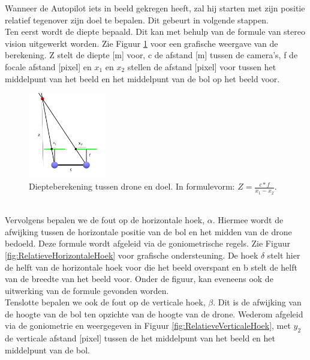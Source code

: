 \noindent
Wanneer de Autopilot iets in beeld gekregen heeft, zal hij starten met zijn positie relatief tegenover zijn doel te bepalen. Dit gebeurt in volgende stappen.
\\
Ten eerst wordt de diepte bepaald. Dit kan met behulp van de formule van stereo vision \cite{website:techbriefs} uitgewerkt worden.
Zie Figuur \ref{fig:DiepteberekeningDroneEnDoel} voor een grafische weergave van de berekening. Z stelt de diepte [m] voor, c de afstand [m] tussen de camera's, f de focale afstand [pixel] en $x_1$ en $x_2$ stellen de afstand [pixel] voor tussen het middelpunt van het beeld en het middelpunt van de bol op het beeld voor.
\begin{figure}[h]
	\centering
	\includegraphics[width=0.3\textwidth]{DiepteberekeningDroneEnDoel.png}
	\caption{Diepteberekening tussen drone en doel. In formulevorm: \(Z = \frac{c * f}{x_1 - x_2}\).}
	\label{fig:DiepteberekeningDroneEnDoel}
\end{figure}
\\
Vervolgens bepalen we de fout op de horizontale hoek, $\alpha$. Hiermee wordt de afwijking tussen de horizontale positie van de bol en het midden van de drone bedoeld. Deze formule wordt afgeleid via de goniometrische regels. Zie Figuur \ref{fig:RelatieveHorizontaleHoek} voor grafische ondersteuning. De hoek $\delta$ stelt hier de helft van de horizontale hoek voor die het beeld overspant en b stelt de helft van de breedte van het beeld voor. Onder de figuur, kan eveneens ook de uitwerking van de formule gevonden worden.
\\
Tenslotte bepalen we ook de fout op de verticale hoek, $\beta$. Dit is de afwijking van de hoogte van de bol ten opzichte van de hoogte van de drone. Wederom afgeleid via de goniometrie en weergegeven in Figuur \ref{fig:RelatieveVerticaleHoek}, met $y_2$ de verticale afstand [pixel] tussen de het middelpunt van het beeld en het middelpunt van de bol.
